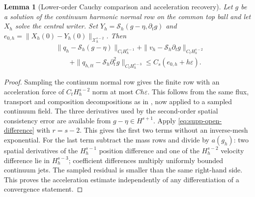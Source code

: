 \documentclass[11pt]{article}
\numberwithin{equation}{section}
\newtheorem{lemma}[lemma]{Lemma}
\theoremstyle{definition}
\theoremstyle{remark}
\begin{document}
\begin{lemma}[Lower-order Cauchy comparison and acceleration recovery]
\label{lem:supp-open-continuum-comparison}
Let $g$ be a solution of the continuum harmonic normal row on the common
top ball and let $X_h$ solve the central writer.  Set
$Y_h=\mathcal S_h(g-\eta,\partial_tg)$ and
$e_{0,h}=\|X_h(0)-Y_h(0)\|_{\mathcal X_h^{s-2}}$.
Then
\begin{equation}
 \begin{split}
 &\|q_h-\mathcal S_h(g-\eta)\|_{C_tH_h^{s-1}}
 +\|v_h-\mathcal S_h\partial_tg\|_{C_tH_h^{s-2}}\\
 &\qquad
 +\|q_{h,tt}-\mathcal S_h\partial_t^2g\|_{C_tH_h^{s-3}}
 \le C_s(e_{0,h}+h\varepsilon).
 \end{split}
 \label{eq:supp-open-sampled-comparison}
\end{equation}
\end{lemma}
\begin{proof}
Sampling the continuum normal row gives the finite row with an acceleration
force of $C_tH_h^{s-2}$ norm at most $Ch\varepsilon$.
This follows from the same flux, transport and composition decompositions
as in , now applied to a sampled
continuum field.  The three derivatives used by the second-order spatial
consistency error are available from $g-\eta\in H^{s+1}$.
Apply \eqref{eq:supp-open-difference} with $r=s-2$.  This gives the first
two terms without an inverse-mesh exponential.  For the last term subtract
the mass rows and divide by $a(g_h)$: two spatial derivatives of the
$H_h^{s-1}$ position difference and one of the $H_h^{s-2}$ velocity
difference lie in $H_h^{s-3}$; coefficient differences multiply uniformly
bounded continuum jets.  The sampled residual is smaller than the same
right-hand side.  This proves the acceleration estimate independently of
any differentiation of a convergence statement.
\end{proof}
\end{document}
